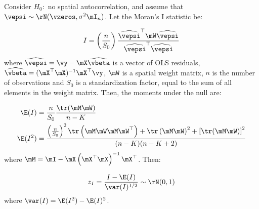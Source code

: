 \documentclass[english,12pt]{book}\usepackage[]{graphicx}\usepackage[]{xcolor}
\begin{document}
\begin{theorem}[Moran's $I$]\label{teo:Moran-for-residuals}
Consider $H_0:$ no spatial autocorrelation, and assume that $\vepsi \sim \rN(\vzeros, \sigma^2\mI_n)$. Let the Moran's I statistic be:

\begin{equation}\label{eq:I_Moran_res_1}
I = \left(\frac{n}{S_0}\right)\frac{\widehat{\vepsi}^\top \mW\widehat{\vepsi}}{\widehat{\vepsi}^\top\widehat{\vepsi}}
\end{equation}
where $\widehat{\vepsi} = \vy - \mX\widehat{\vbeta}$ is a vector of OLS residuals, $\widehat{\vbeta} = (\mX^\top\mX)^{-1}\mX^\top\vy$,  $\mW$ is a spatial weight matrix, $n$ is the number of observations and $S_0$ is a standardization factor, equal to the sum of all elements in the weight matrix. Then, the moments under the null are:


\begin{equation}
\begin{aligned}
  \E(I)   & = \frac{n}{S_0}\frac{\tr(\mM\mW)}{n - K} \\
  \E(I^2) & = \frac{\left(\frac{n}{S_0}\right)^2\tr\left(\mM\mW\mM\mW^\top\right) + \tr\left(\mM\mW\right)^2 + \left[\tr(\mM\mW)\right]^2}{(n -K)(n-K+2)}
\end{aligned}
\end{equation}
%
where $\mM = \mI- \mX\left(\mX^\top\mX\right)^{-1}\mX^\top$. Then:

\begin{equation}
z_I = \frac{I - \E(I)}{\var(I)^{1/2}}\sim \rN(0, 1)
\end{equation}
%
where $\var(I) = \E(I^2) - \E(I)^2$. 
\end{theorem}



\end{document}
